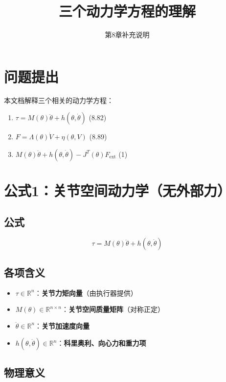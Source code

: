 \documentclass[12pt,a4paper]{article}
\title{三个动力学方程的理解}
\author{第8章补充说明}
\date{}
\begin{document}
\maketitle

\section{问题提出}

本文档解释三个相关的动力学方程：
\begin{enumerate}
\item $\tau = M(\theta)\ddot{\theta} + h(\theta, \dot{\theta})$ \quad (8.82)
\item $F = \Lambda(\theta)\dot{V} + \eta(\theta, V)$ \quad (8.89)
\item $M(\theta)\ddot{\theta} + h(\theta, \dot{\theta}) - J^T(\theta)F_{\text{ext}}$ \quad (1)
\end{enumerate}

\section{公式1：关节空间动力学（无外部力）}

\subsection{公式}

\begin{equation}
\tau = M(\theta)\ddot{\theta} + h(\theta, \dot{\theta}) \tag{8.82}
\end{equation}

\subsection{各项含义}

\begin{itemize}
\item $\tau \in \mathbb{R}^n$：\textbf{关节力矩向量}（由执行器提供）
\item $M(\theta) \in \mathbb{R}^{n \times n}$：\textbf{关节空间质量矩阵}（对称正定）
\item $\ddot{\theta} \in \mathbb{R}^n$：\textbf{关节加速度向量}
\item $h(\theta, \dot{\theta}) \in \mathbb{R}^n$：\textbf{科里奥利、向心力和重力项}
\end{itemize}

\subsection{物理意义}
\end{document}
